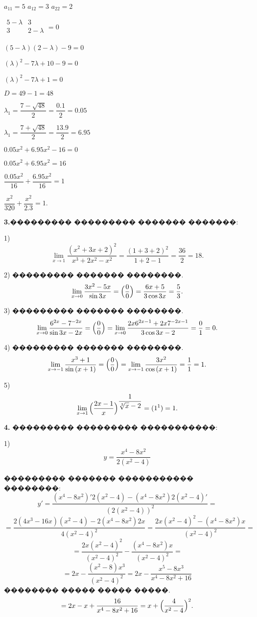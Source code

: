 \documentclass{article}
\begin{document}
$a_{11}=5$
$a_{12}=3$ 
$a_{22}=2$

$
\begin{array}{|cc|}
5-\lambda&3\\
3&2-\lambda\\
\end{array}  =0$

$(5-\lambda)(2-\lambda)-9=0$

$(\lambda)^2-7\lambda+10-9=0$

$(\lambda)^2-7\lambda+1=0$

$D=49-1=48$

$\lambda_1=\dfrac{7-\sqrt{48}}{2}=\dfrac{0.1}{2}=0.05$

$\lambda_1=\dfrac{7+\sqrt{48}}{2}=\dfrac{13.9}{2}=6.95$

$0.05x^2+6.95x^2-16=0$

$0.05x^2+6.95x^2=16$

$\dfrac{0.05x^2}{16}+\dfrac{6.95x^2}{16}=1$

$\dfrac{x^2}{320}+\dfrac{x^2}{2.3}=1.$

\textbf{3.}��������� ��������� ������� �������:

1)
$$\lim_{x\to1}{\dfrac{(x^2+3x+2)^2}{x^3+2x^2-x^2}}=\dfrac{(1+3+2)^2}{1+2-1}=\dfrac{36}{2}=18.$$

2) ��������� ������� ��������.
$$\lim_{x\to0}{\dfrac{3x^2-5x}{\sin{3x}}}=\Bigl(\dfrac{0}{0}\Bigr)=\dfrac{6x+5}{3\cos{3x}}=\dfrac{5}{3}.$$

3) ��������� ������� ��������.
$$\lim_{x\to0}{\dfrac{6^{2x}-7^{-2x}}{\sin{3x}-2x}}=\Bigl(\dfrac{0}{0}\Bigr)=\lim_{x\to0}\dfrac{2x6^{2x-1}+2x7^{-2x-1}}{3\cos{3x}-2}=\dfrac{0}{1}=0.$$

4) ��������� ������� ��������.
$$\lim_{x\to-1}{\dfrac{x^3+1}{\sin{(x+1)}}}=\Bigl(\dfrac{0}{0}\Bigr)=\lim_{x\to-1}\dfrac{3x^2}{\cos{(x+1)}}=\dfrac{1}{1}=1.$$

5)
$$\lim_{x\to1}{\Bigl(\dfrac{2x-1}{x}\Bigr)^{\dfrac{1}{\sqrt[3]{x}-2}}=(1^1)=1}.$$

\textbf{4.} ��������� ��������� �����������:

1) $$y=\dfrac{x^4-8x^2}{2(x^2-4)} $$

��������� ������� ����������� ��������:
$$y'=\dfrac{(x^4-8x^2)'2(x^2-4)-(x^4-8x^2)2(x^2-4)'}{(2(x^2-4))^2}= $$
$$=\dfrac{2(4x^3-16x)(x^2-4)-2(x^4-8x^2)2x}{4(x^2-4)^2}=
\dfrac{2x(x^2-4)^2-(x^4-8x^2)x}{(x^2-4)^2}= $$
$$=\dfrac{2x(x^2-4)^2}{(x^2-4)^2}-\dfrac{(x^4-8x^2)x}{(x^2-4)^2}= $$
$$=2x-\dfrac{(x^2-8)x^3}{(x^2-4)^2}=2x-\dfrac{x^5-8x^3}{x^4-8x^2+16}$$
�������� ����� ����� �����.
$$=2x-x+\dfrac{16}{x^4-8x^2+16}=x+\Bigl(\dfrac{4}{x^2-4}\Bigr)^2.$$
\end{document}
